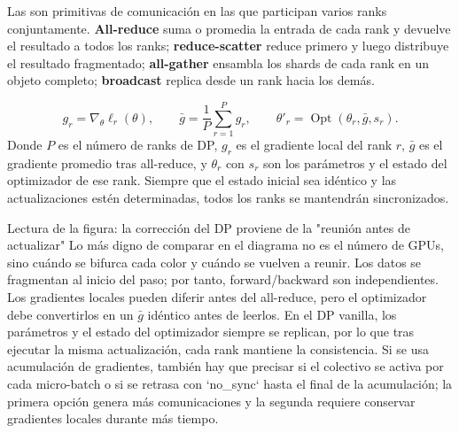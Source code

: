 
Las  son primitivas de comunicación en las que participan varios ranks conjuntamente. \textbf{All-reduce} suma o promedia la entrada de cada rank y devuelve el resultado a todos los ranks; \textbf{reduce-scatter} reduce primero y luego distribuye el resultado fragmentado; \textbf{all-gather} ensambla los shards de cada rank en un objeto completo; \textbf{broadcast} replica desde un rank hacia los demás.


\[
g_r=\nabla_\theta \ell_r(\theta),
\qquad
\bar g=\frac{1}{P}\sum_{r=1}^{P}g_r,
\qquad
\theta'_r=\operatorname{Opt}(\theta_r,\bar g,s_r).
\]
Donde $P$ es el número de ranks de DP, $g_r$ es el gradiente local del rank $r$, $\bar g$ es el gradiente promedio tras all-reduce, y $\theta_r$ con $s_r$ son los parámetros y el estado del optimizador de ese rank. Siempre que el estado inicial sea idéntico y las actualizaciones estén determinadas, todos los ranks se mantendrán sincronizados.


\begin{knowledgebox}{Lectura de la figura: la corrección del DP proviene de la "reunión antes de actualizar"}
Lo más digno de comparar en el diagrama no es el número de GPUs, sino cuándo se bifurca cada color y cuándo se vuelven a reunir. Los datos se fragmentan al inicio del paso; por tanto, forward/backward son independientes. Los gradientes locales pueden diferir antes del all-reduce, pero el optimizador debe convertirlos en un $\bar g$ idéntico antes de leerlos. En el DP vanilla, los parámetros y el estado del optimizador siempre se replican, por lo que tras ejecutar la misma actualización, cada rank mantiene la consistencia. Si se usa acumulación de gradientes, también hay que precisar si el colectivo se activa por cada micro-batch o si se retrasa con `no\_sync` hasta el final de la acumulación; la primera opción genera más comunicaciones y la segunda requiere conservar gradientes locales durante más tiempo.
\end{knowledgebox}

